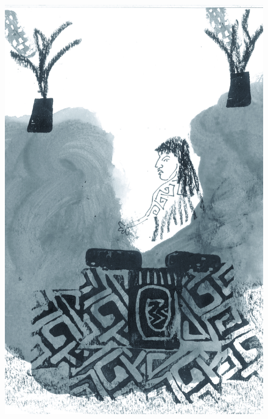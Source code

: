 \vspace*{\fill}

\pagebreak
\thispagestyle{empty}
\begin{figure}
\vspace*{-2cm}
\hspace*{-2.2cm}\includegraphics[width=138mm]{./imgs/img8.jpg}
\end{figure}

\chapter*{}

\mbox{}\vspace*{\fill}

